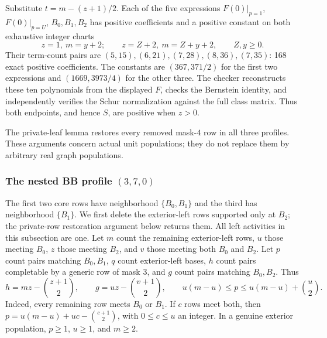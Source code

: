 \documentclass[11pt,a4paper]{article}
\theoremstyle{remark}\newtheorem{remark}[theorem]{Remark}
\begin{document}
Substitute $t=m-(z+1)/2$. Each of the five expressions
$F(0)|_{p=1}$, $F(0)|_{p=U}$, $B_0,B_1,B_2$ has positive coefficients
and a positive constant on both exhaustive integer charts
\[
 z=1,\ m=y+2;\qquad z=Z+2,\ m=Z+y+2,\qquad Z,y\ge0.
\]
Their term-count pairs are $(5,15),(6,21),(7,28),(8,36),(7,35)$:
168 exact positive coefficients. The constants are $(367,371/2)$
for the first two expressions and $(1669,3973/4)$ for the other three.
The checker reconstructs these ten polynomials from the displayed $F$,
checks the Bernstein identity, and independently verifies the Schur
normalization against the full class matrix.
Thus both endpoints, and hence $S$, are positive when $z>0$.

The private-leaf lemma restores every removed mask-$4$ row in all three
profiles. These arguments concern actual unit populations; they do not
replace them by arbitrary real graph populations.

\subsubsection{The nested BB profile \texorpdfstring{$(3,7,0)$}{(3,7,0)}}
\label{mrn:t:tn:bb370:profile}

The first two core rows have neighborhood $\{B_0,B_1\}$ and the
third has neighborhood $\{B_1\}$.  We first delete the exterior-left
rows supported only at $B_2$; the private-row restoration argument below
returns them.  All left activities in this subsection are one.
Let $m$ count the remaining exterior-left rows, $u$ those meeting $B_0$,
$z$ those meeting $B_2$, and $v$ those meeting both $B_0$ and $B_2$.
Let $p$ count pairs matching $B_0,B_1$, $q$ count exterior-left bases,
$h$ count pairs completable by a generic row of mask $3$, and $g$ count
pairs matching $B_0,B_2$.  Thus
\begin{equation}
 h=mz-\binom{z+1}{2},\qquad
 g=uz-\binom{v+1}{2},\qquad
 u(m-u)\le p\le u(m-u)+\binom u2.
 \label{mrn:t:tn:bb370:counts}
\end{equation}
Indeed, every remaining row meets $B_0$ or $B_1$.  If $c$ rows meet both,
then $p=u(m-u)+uc-\binom{c+1}{2}$, with $0\le c\le u$ an integer.
In a genuine exterior population, $p\ge1$, $u\ge1$, and $m\ge2$.
\end{document}
